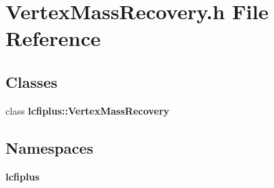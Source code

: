 \section{Vertex\+Mass\+Recovery.\+h File Reference}
\label{VertexMassRecovery_8h}
\subsection*{Classes}
\begin{DoxyCompactItemize}
\item 
class \textbf{ lcfiplus\+::\+Vertex\+Mass\+Recovery}
\end{DoxyCompactItemize}
\subsection*{Namespaces}
\begin{DoxyCompactItemize}
\item 
 \textbf{ lcfiplus}
\end{DoxyCompactItemize}
